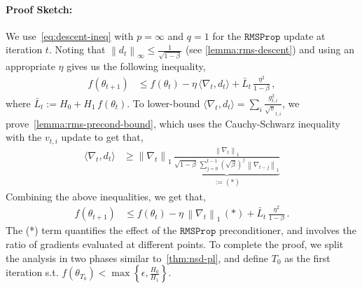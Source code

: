 \documentclass{article}
\newcommand{\ti}[1]{#1_{t,i}}
\newcommand{\norm}[1]{\left\|#1 \right\|}
\newcommand{\tht}{\theta_t}
\newcommand{\thtt}{\theta_{t+1}}
\newcommand{\RMS}{\texttt{RMSProp}}
\begin{document}
\paragraph{Proof Sketch:} We use~\cref{eq:descent-ineq} with $p = \infty$ and $q = 1$ for the $\RMS$ update at iteration $t$. Noting that $\norm{d_t}_\infty \leq \frac{1}{\sqrt{1 - \beta}}$ (see \cref{lemma:rms-descent}) and using an appropriate $\eta$ gives us the following inequality,  
\begin{align}
f(\thtt) & \leq f(\tht) - \eta \, \langle \nabla_t, d_t \rangle +  \bar{L}_t \, \frac{\eta^2}{1 - \beta} \,,   \nonumber
\end{align}
where $\bar{L}_t := H_0 + H_1 \, f(\tht)$. To lower-bound $\langle \nabla_t, d_t \rangle = \sum_i \frac{\ti{g^2}}{\ti{\sqrt{v}}}$, we prove~\cref{lemma:rms-precond-bound}, which uses the Cauchy-Schwarz inequality with
the $v_{t,i}$ update to get that,  
\begin{align}
\langle \nabla_t, d_t \rangle & \geq \norm{\nabla_t}_1 \, \underbrace{\frac{\norm{\nabla_t}_1}{\sqrt{1 - \beta} \, \sum_{j = 0}^{t-1} (\sqrt{\beta})^{j} \, \norm{\nabla_{t-j}}_1}}_{:= (*)}    \nonumber
\end{align}
Combining the above inequalities, we get that, 
\begin{align}
f(\thtt) & \leq f(\tht) - \eta \, \norm{\nabla_t}_{1} \, (*) + \bar{L}_t \, \frac{\eta^2}{1 - \beta}\,. \label{eq:rms-main-1}
\end{align}
The (*) term quantifies the effect of the $\RMS$ preconditioner, and involves the ratio of gradients evaluated at different points. To complete the proof, we split the analysis in two phases similar to~\cref{thm:nsd-pl}, and define $T_0$ as the first iteration s.t. $f(\theta_{T_0}) < \max\left\{\epsilon, \frac{H_0}{H_1} \right\}$.  
\end{document}
